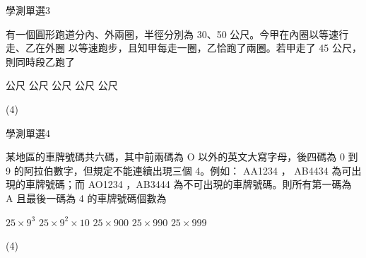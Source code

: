     \begin{QUESTION}
        \begin{ExamInfo}{97}{學測}{單選}{3}
        \end{ExamInfo}
        \begin{ExamAnsRateInfo}{73}{97}{84}{38}
        \end{ExamAnsRateInfo}
        \begin{QBODY}
            有一個圓形跑道分內、外兩圈，半徑分別為 30、50 公尺。今甲在內圈以等速行走、乙在外圈 以等速跑步，且知甲每走一圈，乙恰跑了兩圈。若甲走了 45 公尺，則同時段乙跑了 \\
			\begin{QOPSINONELINE} 
				 公尺  公尺  公尺  公尺  公尺
			\end{QOPSINONELINE}
        \end{QBODY}
        \begin{QFROMS}
        \end{QFROMS}
        \begin{QTAGS}\end{QTAGS}
        \begin{QANS}
            (4)
        \end{QANS}
        \begin{QSOLLIST}
        \end{QSOLLIST}
        \begin{QEMPTYSPACE}
        \end{QEMPTYSPACE}
    \end{QUESTION}
    \begin{QUESTION}
        \begin{ExamInfo}{97}{學測}{單選}{4}
        \end{ExamInfo}
        \begin{ExamAnsRateInfo}{39}{69}{31}{17}
        \end{ExamAnsRateInfo}
        \begin{QBODY}
            某地區的車牌號碼共六碼，其中前兩碼為 O 以外的英文大寫字母，後四碼為 0 到 9 的阿拉伯數字，但規定不能連續出現三個 4。例如： AA1234 ， AB4434 為可出現的車牌號碼；而 AO1234 ，AB3444 為不可出現的車牌號碼。則所有第一碼為 A 且最後一碼為 4 的車牌號碼個數為 
			\begin{QOPS}
				\QOP $25 \times 9^3$ 
				\QOP $25\times 9^2 \times 10$        
				\QOP $25 \times 900$
				\QOP $25 \times 990$ 
				\QOP $25 \times 999$ 
			\end{QOPS}
        \end{QBODY}
        \begin{QFROMS}
        \end{QFROMS}
        \begin{QTAGS}\end{QTAGS}
        \begin{QANS}
            (4)
        \end{QANS}
        \begin{QSOLLIST}
        \end{QSOLLIST}
        \begin{QEMPTYSPACE}
        \end{QEMPTYSPACE}
    \end{QUESTION}
